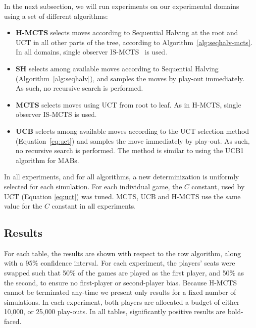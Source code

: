 \documentclass[a4paper]{llncs}
\begin{document}
In the next subsection, we will run experiments on our experimental domains using a set of different algorithms:
\begin{itemize}
\item \textbf{H-MCTS} selects moves according to Sequential Halving at the root and UCT in all other parts of the tree, according to Algorithm~\ref{alg:seqhalv-mcts}. In all domains, single observer IS-MCTS~\cite{cowling2012} is used.
\item \textbf{SH} selects among available moves according to Sequential Halving (Algorithm~\ref{alg:seqhalv}), and samples the moves by play-out immediately. As such, no recursive search is performed.
\item \textbf{MCTS} selects moves using UCT from root to leaf. As in {\sc H-MCTS}, single observer IS-MCTS is used.
\item \textbf{UCB} selects among available moves according to the UCT selection method (Equation~\ref{eq:uct}) and samples the move immediately by play-out. As such, no recursive search is performed. The method is similar to using the UCB1 algorithm for MABs.
\end{itemize}
In all experiments, and for all algorithms, a new determinization is uniformly selected for each simulation. For each individual game, the $C$ constant, used by UCT (Equation \ref{eq:uct}) was tuned. MCTS, UCB and H-MCTS use the same value for the $C$ constant in all experiments.

\subsection{Results}
\label{subsec:results}

For each table, the results are shown with respect to the row algorithm, along with a 95\% confidence interval. For each experiment, the players' seats were swapped such that 50\% of the games are played as the first player, and 50\% as the second, to ensure no first-player or second-player bias. Because H-MCTS cannot be terminated any-time we present only results for a fixed number of simulations. In each experiment, both players are allocated a budget of either 10,000, or 25,000 play-outs. In all tables, significantly positive results are bold-faced.
\end{document}
